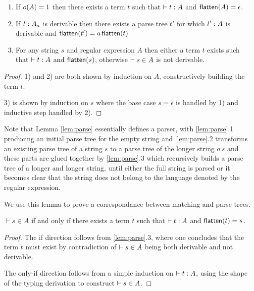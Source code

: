 \begin{lemma}[Parsing]
\label{lem:parse}
\noindent
\begin{enumerate}
\item If $o(A) = 1$ then there exists a term $t$ such that
$\vdash t : A$ and $\mathsf{flatten}(A)=\epsilon$.
\item If $t : A_{a_{}}$ is derivable then there exists a parse
tree $t'$ for which $t' : A$ is derivable and $\mathsf{flatten}(t')=a
\,\mathsf{flatten}(t)$
\item For any string $s$ and regular expression $A$ then either 
a term $t$ exists such that $\vdash t : A$ and $\mathsf{flatten}(s)$, otherwise
$\vdash s \in A$ is not derivable. 
\end{enumerate}
\end{lemma}
\begin{proof}
1) and 2) are both shown by induction on $A$, constructively building
the term $t$.

3) is shown by induction on $s$ where the base case $s = \epsilon$ is
handled by 1) and inductive step handled by 2). 
\end{proof}
Note that Lemma \ref{lem:parse} essentially defines a parser, with
\ref{lem:parse}.1 producing an initial parse tree for the empty string and
\ref{lem:parse}.2 transforms an existing parse tree of a string $s$ to
a parse tree of the longer string $a \, s$ and these parts are glued
together by \ref{lem:parse}.3 which recursively builds a parse tree of
a longer and longer string, until either the full string is parsed or
it becomes clear that the string does not belong to the language
denoted by the regular expression.

We use this lemma to prove a correspondance between matching and parse trees.
\begin{lemma} 
\label{lem:matchparse}
$\vdash s \in A$ if and only if there exists a term $t$ such that $\vdash t : A$ and $\mathsf{flatten}(t) = s$.
\end{lemma}
\begin{proof}
The if direction follows from \ref{lem:parse}.3, where one concludes
that the term $t$ must exist by contradiction of $\vdash s \in A$ being
both derivable and not derivable.

The only-if direction follows from a simple induction on
$\vdash t : A$, using the shape of the typing derivation to construct $\vdash s \in A$.
\end{proof}


